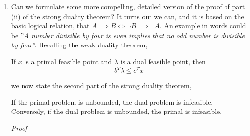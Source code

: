 \begin{enumerate}
          \begin{Thm}
              Given the problem \eqref{eq:constrained-problem}, and a point $x^*\in\Omega$ for which the KKT conditions are satisfied for some $\lambda^*$.
              If the problem is convex as defined in definition \ref{def:convex-problem}, then $x^*$ is a global minimizer.
          \end{Thm}
          \textit{Proof} Pick any $x\in\Omega$.
          From the definition \ref{def:convex-problem}, we have for the active constraints that
          \begin{align*}
              \nabla c_i(x^*)^T(x - x^*) & \geq c_i(x) - c_i(x^*) = c_i(x) \geq 0 \\
              \nabla c_j(x^*)^T(x - x^*) & = c_j(x) - c_j(x^*) = 0                \\
          \end{align*}
          Then, by inspecting the convexity condition on the objective function we obtain
          \begin{align*}
              f(x) - f(x^*) \geq \nabla f(x^*)^T(x - x^*) = \sum_{i\in\mathcal{A}(x^*)} \lambda_i \nabla c_i (x^*)^T (x - x^*)  \geq 0
          \end{align*}
          Thus, $f(x) \geq f(x^*)$ for any $x \in \Omega$. \hfill$\square$
    \item Can we formulate some more compelling, detailed version of the proof of part (ii) of the strong duality theorem?
          It turns out we can, and it is based on the basic logical relation, that $A \implies B \iff \lnot B \implies \lnot A$.
          An example in words could be ''\textit{A number divisible by four is even implies that no odd number is divisible by four}''.
          Recalling the weak duality theorem,
          \begin{Thm}
              If $x$ is a primal feasible point and $\lambda$ is a dual feasible point, then
              \[
                  b^T\lambda \leq c^T x
              \]
          \end{Thm}
          we now state the second part of the strong duality theorem,
          \begin{Thm}
              If the primal problem is unbounded, the dual problem is infeasible.
              Conversely, if the dual problem is unbounded, the primal is infeasible.
          \end{Thm}
          \textit{Proof}

\end{enumerate}

